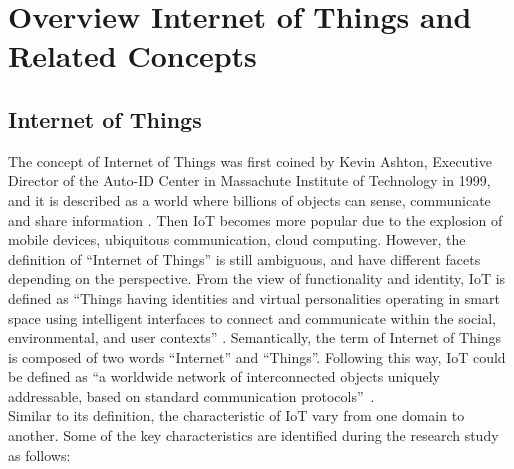 \section{Overview Internet of Things and Related Concepts }
\subsection{Internet of Things}
The concept of Internet of Things was first coined by Kevin Ashton, Executive Director of the Auto-ID Center in Massachute Institute of Technology in 1999, and it is described as a world where billions of objects can sense, communicate and share information \cite{madakam2015internet}. Then IoT becomes more popular due to the explosion of mobile devices, ubiquitous communication, cloud computing. However, the definition of ``Internet of Things'' is still ambiguous, and have different facets depending on the perspective. From the view of functionality and identity, IoT is defined as ``Things having identities and virtual personalities operating in smart space using intelligent interfaces to connect and communicate within the social, environmental, and user contexts'' \cite{ray2018survey}. Semantically, the term of Internet of Things is composed of two words ``Internet'' and ``Things''. Following this way, IoT could be defined as ``a worldwide network of interconnected objects uniquely addressable, based on standard communication protocols''~\cite{minerva2015towards}.\\

Similar to its definition, the characteristic of IoT vary from one domain to another. Some of the key characteristics are identified during the research study as follows:

